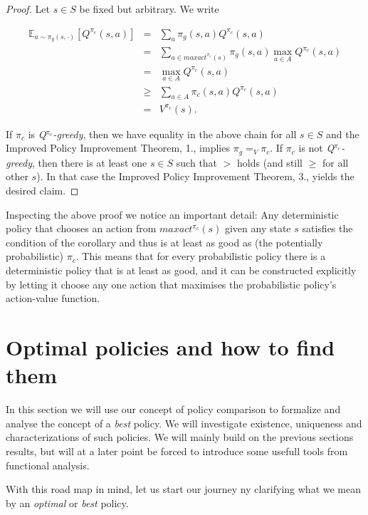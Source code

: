 \documentclass[11pt]{article} %
\begin{document}
\begin{proof}
	Let $s \in S$ be fixed but arbitrary. We write

	\[
		\begin{array}{rll}
			\mathbb{E}_{a \sim \pi_g(s,\cdot)}[Q^{\pi_c}(s,a)] 	& = & \sum_a \pi_g(s,a) Q^{\pi_c}(s,a) \\
													& = & \sum _{a \in maxact^{\pi_c}(s)} \pi_g(s,a) \max_{a \in A} Q^{\pi_c}(s,a) \\
													& = & \max_{a \in A} Q^{\pi_c}(s,a) \\
													& \ge & \sum_{a \in A} \pi_c(s,a) Q^{\pi_c}(s,a) \\
													& = & V^{\pi_c}(s).
		\end{array}
	\]

	If $\pi_c$ is \textit{Q}$^{\pi_c}$\textit{-greedy}, then we have equality in the above chain for all $s \in S$ and the Improved Policy Improvement Theorem, 1., implies $\pi_g =_V \pi_c$. If $\pi_c$ is not \textit{Q}$^{\pi_c}$\textit{-greedy}, then there is at least one $s \in S$ such that $>$ holds (and still $\ge$ for all other $s$). In that case the Improved Policy Improvement Theorem, 3., yields the desired claim.
\end{proof}

Inspecting the above proof we notice an important detail: Any deterministic policy that chooses an action from $maxact^{\pi_c}(s)$ given any state $s$ satisfies the condition of the corollary and thus is at least as good as (the potentially probabilistic) $\pi_c$. This means that for every probabilistic policy there is a deterministic policy that is at least as good, and it can be constructed explicitly by letting it choose any one action that maximises the probabilistic policy's action-value function.

\newpage

\section{Optimal policies and how to find them}

In this section we will use our concept of policy comparison to formalize and analyse the concept of a \textit{best} policy. We will investigate existence, uniqueness and characterizations of such policies. We will mainly build on the previous sections results, but will at a later point be forced to introduce some usefull tools from functional analysis.

With this road map in mind, let us start our journey ny clarifying what we mean by an \textit{optimal} or \textit{best} policy.
\end{document}
